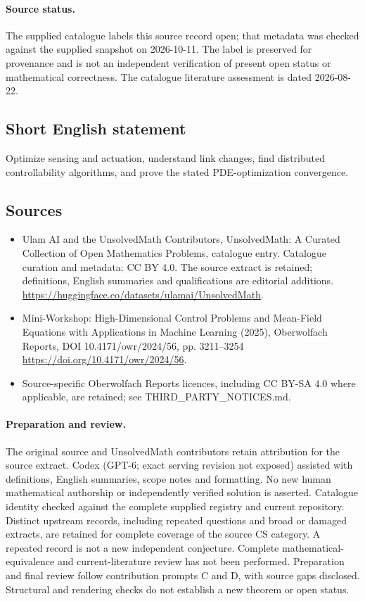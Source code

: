 \documentclass[11pt]{article}
\begin{document}
\paragraph{Source status.}
The supplied catalogue labels this source record open; that metadata was checked against the supplied snapshot on 2026-10-11. The label is preserved for provenance and is not an independent verification of present open status or mathematical correctness. The catalogue literature assessment is dated 2026-08-22.
\subsection{Short English statement}
Optimize sensing and actuation, understand link changes, find distributed controllability algorithms, and prove the stated PDE-optimization convergence.
\subsection{Sources}
\begin{itemize}
\item[\hypertarget{source:statement:1}{S1}] Ulam AI and the UnsolvedMath Contributors, UnsolvedMath: A Curated Collection of Open Mathematics Problems, catalogue entry. Catalogue curation and metadata: CC BY 4.0. The source extract is retained; definitions, English summaries and qualifications are editorial additions.
\url{https://huggingface.co/datasets/ulamai/UnsolvedMath}.
\item[\hypertarget{source:statement:2}{S2}] Mini-Workshop: High-Dimensional Control Problems and Mean-Field Equations with Applications in Machine Learning (2025), Oberwolfach Reports, DOI 10.4171/owr/2024/56, pp. 3211--3254
\url{https://doi.org/10.4171/owr/2024/56}.
\item Source-specific Oberwolfach Reports licences, including CC BY-SA 4.0 where applicable, are retained; see THIRD\_PARTY\_NOTICES.md.
\end{itemize}
\paragraph{Preparation and review.}
The original source and UnsolvedMath contributors retain attribution for the source extract. Codex (GPT-6; exact serving revision not exposed) assisted with definitions, English summaries, scope notes and formatting. No new human mathematical authorship or independently verified solution is asserted. Catalogue identity checked against the complete supplied registry and current repository. Distinct upstream records, including repeated questions and broad or damaged extracts, are retained for complete coverage of the source CS category. A repeated record is not a new independent conjecture. Complete mathematical-equivalence and current-literature review has not been performed. Preparation and final review follow contribution prompts C and D, with source gaps disclosed. Structural and rendering checks do not establish a new theorem or open status.
\label{end:statement}
\end{document}
